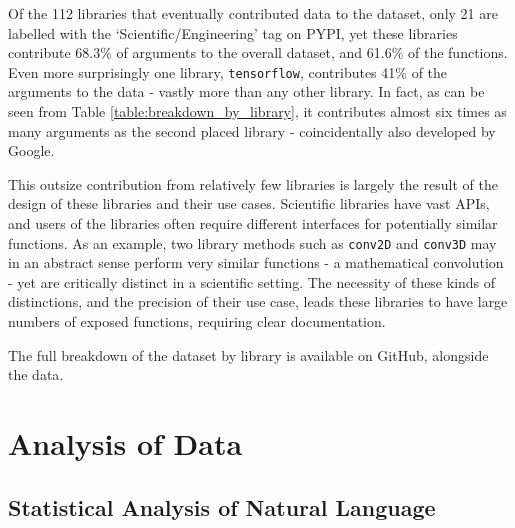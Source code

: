 Of the 112 libraries that eventually contributed data to the dataset, only 21 are labelled with the `Scientific/Engineering' tag on PYPI, yet these libraries contribute 68.3\% of arguments to the overall dataset, and 61.6\% of the functions. 
Even more surprisingly one library, \texttt{tensorflow}, contributes 41\% of the arguments to the data - vastly more than any other library.
In fact, as can be seen from Table \ref{table:breakdown_by_library}, it contributes almost six times as many arguments as the second placed library - coincidentally also developed by Google. 

This outsize contribution from relatively few libraries is largely the result of the design of these libraries and their use cases. 
Scientific libraries have vast APIs, and users of the libraries often require different interfaces for potentially similar functions. 
As an example, two library methods such as \texttt{conv2D} and \texttt{conv3D} may in an abstract sense perform very similar functions - a mathematical convolution - yet are critically distinct in a scientific setting.
The necessity of these kinds of distinctions, and the precision of their use case, leads these libraries to have large numbers of exposed functions, requiring clear documentation.

The full breakdown of the dataset by library is available on GitHub, alongside the data.

\section{Analysis of Data} %
\label{sec:analysis_of_data}


\subsection{Statistical Analysis of Natural Language} %
\label{sub:statistical_analysis_of_natural_language}


